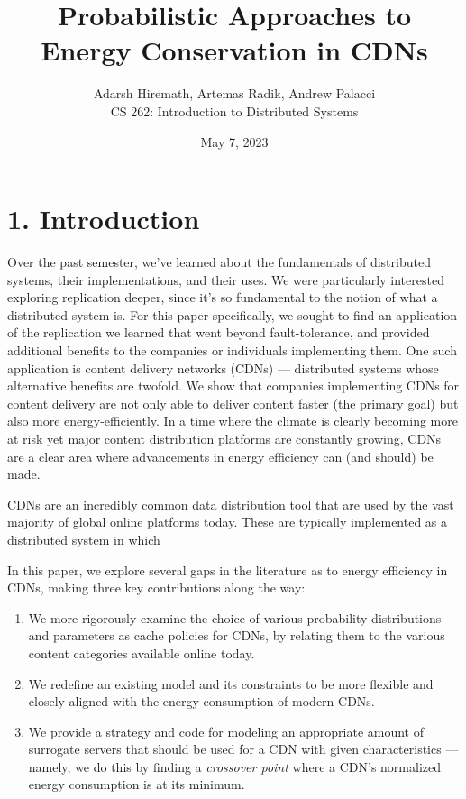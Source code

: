 \documentclass[
	a4paper, %
	10pt, %
	unnumberedsections, %
	twoside, %
]{LTJournalArticle}
\title{Probabilistic Approaches to 
\\ Energy Conservation in CDNs} %
\author{%
	Adarsh Hiremath, Artemas Radik, Andrew Palacci \\
	CS 262: Introduction to Distributed Systems \\
}
\date{May 7, 2023}
\begin{document}
\maketitle %


\section{1. Introduction}
Over the past semester, we've learned about the fundamentals of distributed systems, their implementations, and their uses. We were particularly interested exploring replication deeper, since it's so fundamental to the notion of what a distributed system is. For this paper specifically, we sought to find an application of the replication we learned that went beyond fault-tolerance, and provided additional benefits to the companies or individuals implementing them. One such application is content delivery networks (CDNs) --- distributed systems whose alternative benefits are twofold. We show that companies implementing CDNs for content delivery are not only able to deliver content faster (the primary goal) but also more energy-efficiently. In a time where the climate is clearly becoming more at risk yet major content distribution platforms are constantly growing, CDNs are a clear area where advancements in energy efficiency can (and should) be made.

CDNs are an incredibly common data distribution tool that are used by the vast majority of global online platforms today. These are typically implemented as a distributed system in which 

In this paper, we explore several gaps in the literature as to energy efficiency in CDNs, making three key contributions along the way:
\begin{enumerate}
    \item We more rigorously examine the choice of various probability distributions and parameters as cache policies for CDNs, by relating them to the various content categories available online today.
    \item We redefine an existing model and its constraints to be more flexible and closely aligned with the energy consumption of modern CDNs.
    \item We provide a strategy and code for modeling an appropriate amount of surrogate servers that should be used for a CDN with given characteristics --- namely, we do this by finding a \textit{crossover point} where a CDN's normalized energy consumption is at its minimum.
\end{enumerate}
\end{document}
